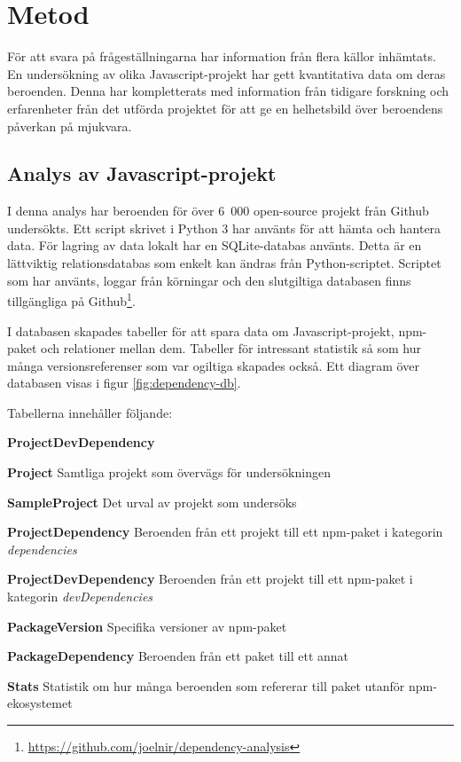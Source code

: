 \section{Metod}
\label{sec:joel_o-method}
För att svara på frågeställningarna har information från flera källor inhämtats. En undersökning av olika Javascript-projekt har gett kvantitativa data om deras beroenden. Denna har kompletterats med information från tidigare forskning och erfarenheter från det utförda projektet för att ge en helhetsbild över beroendens påverkan på mjukvara.

\subsection{Analys av Javascript-projekt}
\label{subsec:joel_o-method-analys}
I denna analys har beroenden för över 6~000 open-source projekt från Github undersökts. Ett script skrivet i Python 3 har använts för att hämta och hantera data. För lagring av data lokalt har en SQLite-databas använts. Detta är en lättviktig relationsdatabas som enkelt kan ändras från Python-scriptet. Scriptet som har använts, loggar från körningar och den slutgiltiga databasen finns tillgängliga på Github\footnote{\url{https://github.com/joelnir/dependency-analysis}}.

I databasen skapades tabeller för att spara data om Javascript-projekt, npm-paket och relationer mellan dem. Tabeller för intressant statistik så som hur många versionsreferenser som var ogiltiga skapades också. Ett diagram över databasen visas i figur \ref{fig:dependency-db}.

Tabellerna innehåller följande:

\begin{labeling}{\textbf{ProjectDevDependency}}
  \item [\textbf{Project}] Samtliga projekt som övervägs för undersökningen
  \item [\textbf{SampleProject}] Det urval av projekt som undersöks
  \item [\textbf{ProjectDependency}] Beroenden från ett projekt till ett npm-paket i kategorin \textit{dependencies}
  \item [\textbf{ProjectDevDependency}] Beroenden från ett projekt till ett npm-paket i kategorin \textit{devDependencies}
  \item [\textbf{PackageVersion}] Specifika versioner av npm-paket
  \item [\textbf{PackageDependency}] Beroenden från ett paket till ett annat
  \item [\textbf{Stats}] Statistik om hur många beroenden som refererar till paket utanför npm-ekosystemet
\end{labeling}

